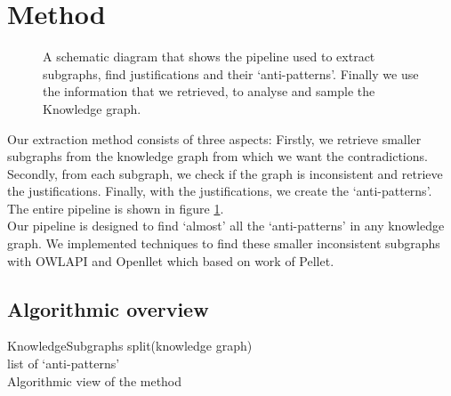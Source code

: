 \documentclass{article}
\begin{document}
\section{Method}
\begin{figure}[!t]
	\centering
	\caption{A schematic diagram that shows the pipeline used to extract subgraphs, find justifications and their `anti-patterns'. Finally 
		we use the information that we retrieved, to analyse and sample the Knowledge graph.}
	\label{fig:simplePipeline}
\end{figure}
Our extraction method consists of three aspects: Firstly, we retrieve smaller subgraphs from the knowledge graph from which we want the contradictions. Secondly, from each subgraph, we check if the graph is inconsistent and retrieve the justifications. Finally, with the justifications, we create the `anti-patterns'. The entire pipeline is shown in figure \ref{fig:simplePipeline}.\\
Our pipeline is designed to find `almost' all the `anti-patterns' in any knowledge graph. We implemented techniques to find these smaller inconsistent subgraphs with OWLAPI\cite{Horridge:2011} and Openllet\cite{Openllet:2019} which based on work of Pellet\cite{Pellet:2007}.\\
\subsection{Algorithmic overview}
\begin{algorithm}[H]
	KnowledgeSubgraphs split(knowledge graph)\\
	
\Return list of `anti-patterns'\\
	\caption{Algorithmic view of the method}
\end{algorithm}
\end{document}
